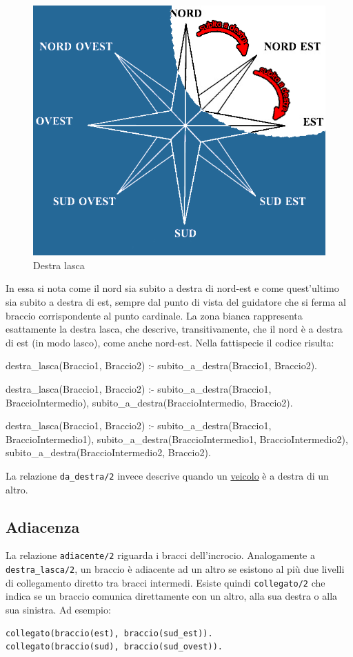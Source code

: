 \begin{figure}[htb]
	\centering
	\includegraphics[width=.8\textwidth]{images/right}
	\caption{Destra lasca}
	\label{fig:right}
\end{figure}

\clearpage 
In essa si nota come il nord sia subito a destra di nord-est e come quest'ultimo sia subito a destra di est, sempre dal punto di vista del guidatore che si ferma al braccio corrispondente al punto cardinale. La zona bianca rappresenta esattamente la destra lasca, che descrive, transitivamente, che il nord è a destra di est (in modo lasco), come anche nord-est. Nella fattispecie il codice risulta:

\begin{verbatimtab}
destra_lasca(Braccio1, Braccio2) :-
	subito_a_destra(Braccio1, Braccio2).

destra_lasca(Braccio1, Braccio2) :-
	subito_a_destra(Braccio1, BraccioIntermedio),
	subito_a_destra(BraccioIntermedio, Braccio2).

destra_lasca(Braccio1, Braccio2) :-
	subito_a_destra(Braccio1, BraccioIntermedio1),
	subito_a_destra(BraccioIntermedio1, BraccioIntermedio2),
	subito_a_destra(BraccioIntermedio2, Braccio2).
\end{verbatimtab}

La relazione \texttt{da\_destra/2} invece descrive quando un \underline{veicolo} è a destra di un altro.


\subsection{Adiacenza}
La relazione \texttt{adiacente/2} riguarda i bracci dell'incrocio. Analogamente a \texttt{destra\_lasca/2}, un braccio è adiacente ad un altro se esistono al più due livelli di collegamento diretto tra bracci intermedi. Esiste quindi \texttt{collegato/2} che indica se un braccio comunica direttamente con un altro, alla sua destra o alla sua sinistra. Ad esempio:
\begin{verbatim}
collegato(braccio(est), braccio(sud_est)).
collegato(braccio(sud), braccio(sud_ovest)).
\end{verbatim}

